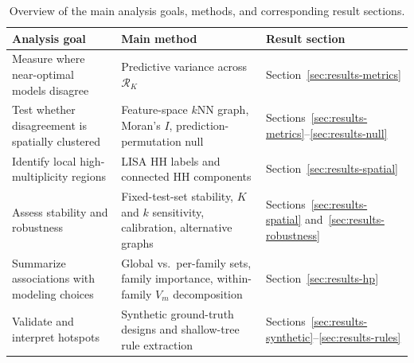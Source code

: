 \begin{table}[H]
\centering
\small
\caption{Overview of the main analysis goals, methods, and corresponding result sections.}
\label{tab:framework-method-result-map}
\begin{tabular}{
@{}
>{\RaggedRight\arraybackslash}p{}
>{\RaggedRight\arraybackslash}p{}
>{\RaggedRight\arraybackslash}p{}
@{}
}
\toprule
\textbf{Analysis goal} & \textbf{Main method} & \textbf{Result section} \\
\midrule
Measure where near-optimal models disagree
& Predictive variance across $\mathcal{R}_K$
& Section~\ref{sec:results-metrics} \\

Test whether disagreement is spatially clustered
& Feature-space $k$NN graph, Moran's $I$, prediction-permutation null
& Sections~\ref{sec:results-metrics}--\ref{sec:results-null} \\

Identify local high-multiplicity regions
& LISA HH labels and connected HH components
& Section~\ref{sec:results-spatial} \\

Assess stability and robustness
& Fixed-test-set stability, $K$ and $k$ sensitivity, calibration, alternative graphs
& Sections~\ref{sec:results-spatial} and~\ref{sec:results-robustness} \\

Summarize associations with modeling choices
& Global vs.\ per-family sets, family importance, within-family $V_m$ decomposition
& Section~\ref{sec:results-hp} \\

Validate and interpret hotspots
& Synthetic ground-truth designs and shallow-tree rule extraction
& Sections~\ref{sec:results-synthetic}--\ref{sec:results-rules} \\
\bottomrule
\end{tabular}
\end{table}
